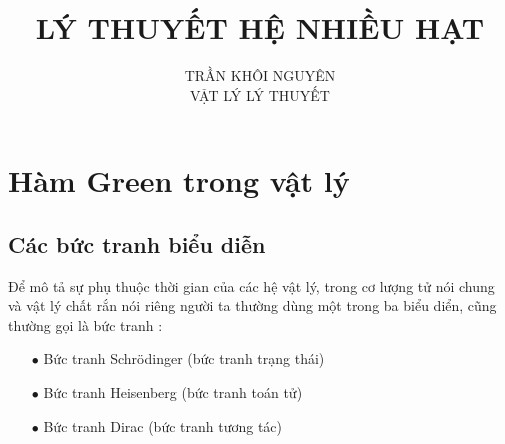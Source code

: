 \documentclass{report}
\title{\Huge{LÝ THUYẾT HỆ NHIỀU HẠT}}
\begin{document}
\tableofcontents
\setlength{\parindent}{20pt}
\newpage
\author{TRẦN KHÔI NGUYÊN \\ VẬT LÝ LÝ THUYẾT}
\maketitle
\chapter{Hàm Green trong vật lý}
\section{Các bức tranh biểu diễn}
Để mô tả sự phụ thuộc thời gian của các hệ vật lý, trong cơ lượng tử nói chung và vật lý chất rắn nói riêng người ta thường dùng một trong ba biểu diển, cũng thường gọi là bức tranh :
\begin{enumerate}
	\item [$\bullet$] Bức tranh Schr\"{o}dinger (bức tranh trạng thái)
	\item [$\bullet$] Bức tranh Heisenberg (bức tranh toán tử)
	\item [$\bullet$] Bức tranh Dirac (bức tranh tương tác)
\end{enumerate}
\end{document}
